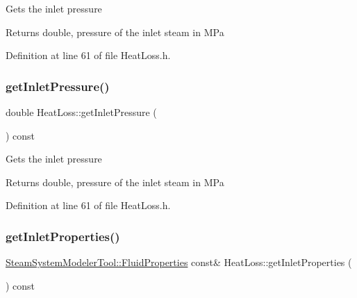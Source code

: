Gets the inlet pressure \begin{DoxyReturn}{Returns}
double, pressure of the inlet steam in M\+Pa 
\end{DoxyReturn}


Definition at line 61 of file Heat\+Loss.\+h.

\mbox{\label{class_heat_loss_a09e6e05477fd6794ea7f42bb43da2f50}} 
\subsubsection{\texorpdfstring{get\+Inlet\+Pressure()}{getInletPressure()}\hspace{0.1cm}{\footnotesize\ttfamily [3/3]}}
{\footnotesize\ttfamily double Heat\+Loss\+::get\+Inlet\+Pressure (\begin{DoxyParamCaption}{ }\end{DoxyParamCaption}) const\hspace{0.3cm}{\ttfamily [inline]}}

Gets the inlet pressure \begin{DoxyReturn}{Returns}
double, pressure of the inlet steam in M\+Pa 
\end{DoxyReturn}


Definition at line 61 of file Heat\+Loss.\+h.

\mbox{\label{class_heat_loss_a7bea461460dbacf1855d5375bbf6c097}} 
\subsubsection{\texorpdfstring{get\+Inlet\+Properties()}{getInletProperties()}\hspace{0.1cm}{\footnotesize\ttfamily [1/3]}}
{\footnotesize\ttfamily \hyperlink{struct_steam_system_modeler_tool_1_1_fluid_properties}{Steam\+System\+Modeler\+Tool\+::\+Fluid\+Properties} const\& Heat\+Loss\+::get\+Inlet\+Properties (\begin{DoxyParamCaption}{ }\end{DoxyParamCaption}) const\hspace{0.3cm}{\ttfamily [inline]}}

